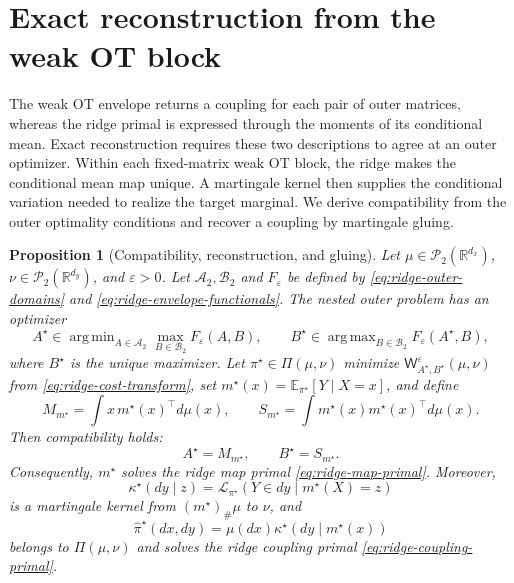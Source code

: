 \documentclass[11pt]{article}
\newcommand{\R}{\mathbb R}
\newcommand{\E}{\mathbb E}
\newcommand{\cP}{\mathcal P}
\DeclareMathOperator*{\argmin}{arg\,min}
\DeclareMathOperator*{\argmax}{arg\,max}
\theoremstyle{plain}
\newtheorem{proposition}[theorem]{Proposition}
\theoremstyle{definition}
\theoremstyle{remark}
\begin{document}
\FloatBarrier
\section{Exact reconstruction from the weak OT block}\label{sec:reconstruction}

The weak OT envelope returns a coupling for each pair of outer matrices, whereas
the ridge primal is expressed through the moments of its conditional mean. Exact
reconstruction requires these two descriptions to agree at an outer optimizer.
Within each fixed-matrix weak OT block, the ridge makes the conditional mean map
unique. A martingale kernel then supplies the conditional variation needed to
realize the target marginal.
We derive compatibility from the outer optimality conditions and recover a coupling
by martingale gluing.

\begin{proposition}[Compatibility, reconstruction, and gluing]
\label{prop:reconstruction}
Let \(\mu\in\cP_2(\R^{d_x})\), \(\nu\in\cP_2(\R^{d_y})\), and
\(\varepsilon>0\). Let \(\mathcal A_2,\mathcal B_2\) and
\(F_\varepsilon\) be defined by \eqref{eq:ridge-outer-domains} and
\eqref{eq:ridge-envelope-functionals}. The nested outer problem has an optimizer
\[
 A^\star\in\argmin_{A\in\mathcal A_2}
 \max_{B\in\mathcal B_2}F_\varepsilon(A,B),
 \qquad
 B^\star\in\argmax_{B\in\mathcal B_2}F_\varepsilon(A^\star,B),
\]
where \(B^\star\) is the unique maximizer. Let
\(\pi^\star\in\Pi(\mu,\nu)\) minimize
\(\mathsf W_{A^\star,B^\star}^\varepsilon(\mu,\nu)\) from
\eqref{eq:ridge-cost-transform}, set
\(m^\star(x)=\E_{\pi^\star}[Y\mid X=x]\), and define
\[
 M_{m^\star}=\int x\,m^\star(x)^\top d\mu(x),\qquad
 S_{m^\star}=\int m^\star(x)m^\star(x)^\top d\mu(x).
\]
Then compatibility holds:
\[
  A^\star=M_{m^\star},\qquad B^\star=S_{m^\star}.
\]
Consequently, \(m^\star\) solves the ridge map primal
\eqref{eq:ridge-map-primal}. Moreover,
\[
  \kappa^\star(dy\mid z)=\mathcal L_{\pi^\star}(Y\in dy\mid m^\star(X)=z)
\]
is a martingale kernel from \((m^\star)_\#\mu\) to \(\nu\), and
\[
  \widehat\pi^\star(dx,dy)=\mu(dx)\kappa^\star(dy\mid m^\star(x))
\]
belongs to \(\Pi(\mu,\nu)\) and solves the ridge coupling primal
\eqref{eq:ridge-coupling-primal}.
\end{proposition}
\end{document}
